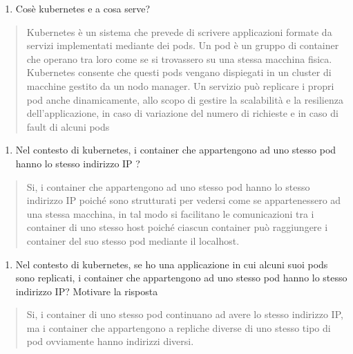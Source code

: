 \begin{enumerate}
\def\labelenumi{\arabic{enumi}.}
\setcounter{enumi}{1}
\item
  Cos\textquotesingle è kubernetes e a cosa serve?
\end{enumerate}

\begin{quote}
Kubernetes è un sistema che prevede di scrivere applicazioni formate da
servizi implementati mediante dei pods. Un pod è un gruppo di container
che operano tra loro come se si trovassero su una stessa macchina
fisica. Kubernetes consente che questi pods vengano dispiegati in un
cluster di macchine gestito da un nodo manager. Un servizio può
replicare i propri pod anche dinamicamente, allo scopo di gestire la
scalabilità e la resilienza dell'applicazione, in caso di variazione del
numero di richieste e in caso di fault di alcuni pods
\end{quote}

\begin{enumerate}
\def\labelenumi{\arabic{enumi}.}
\setcounter{enumi}{2}
\item
  Nel contesto di kubernetes, i container che appartengono ad uno stesso
  pod hanno lo stesso indirizzo IP ?
\end{enumerate}

\begin{quote}
Si, i container che appartengono ad uno stesso pod hanno lo stesso
indirizzo IP poiché sono strutturati per vedersi come se appartenessero
ad una stessa macchina, in tal modo si facilitano le comunicazioni tra i
container di uno stesso host poiché ciascun container può raggiungere i
container del suo stesso pod mediante il localhost.
\end{quote}

\begin{enumerate}
\def\labelenumi{\arabic{enumi}.}
\setcounter{enumi}{3}
\item
  Nel contesto di kubernetes, se ho una applicazione in cui alcuni suoi
  pods sono replicati, i container che appartengono ad uno stesso pod
  hanno lo stesso indirizzo IP? Motivare la risposta
\end{enumerate}

\begin{quote}
Si, i container di uno stesso pod continuano ad avere lo stesso
indirizzo IP, ma i container che appartengono a repliche diverse di uno
stesso tipo di pod ovviamente hanno indirizzi diversi.
\end{quote}

